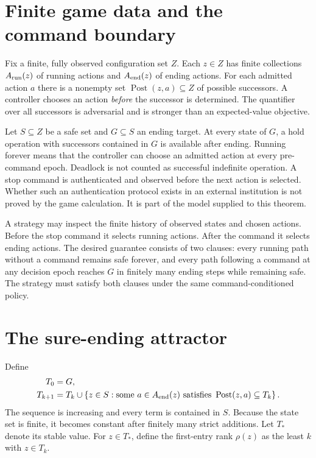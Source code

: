 \section{Finite game data and the command boundary}
Fix a finite, fully observed configuration set $Z$. Each $z\in Z$ has finite collections $A_{\rm run}(z)$ of running actions and $A_{\rm end}(z)$ of ending actions. For each admitted action $a$ there is a nonempty set $\operatorname{Post}(z,a)\subseteq Z$ of possible successors. A controller chooses an action \emph{before} the successor is determined. The quantifier over all successors is adversarial and is stronger than an expected-value objective.

Let $S\subseteq Z$ be a safe set and $G\subseteq S$ an ending target. At every state of $G$, a hold operation with successors contained in $G$ is available after ending. Running forever means that the controller can choose an admitted action at every pre-command epoch. Deadlock is not counted as successful indefinite operation. A stop command is authenticated and observed before the next action is selected. Whether such an authentication protocol exists in an external institution is not proved by the game calculation. It is part of the model supplied to this theorem.

A strategy may inspect the finite history of observed states and chosen actions. Before the stop command it selects running actions. After the command it selects ending actions. The desired guarantee consists of two clauses: every running path without a command remains safe forever, and every path following a command at any decision epoch reaches $G$ in finitely many ending steps while remaining safe. The strategy must satisfy both clauses under the same command-conditioned policy.

\section{The sure-ending attractor}
Define
\begin{align*}
T_0&=G,\\
T_{k+1}&=T_k\cup\left\{z\in S:\text{some }a\in A_{\rm end}(z)
\text{ satisfies }\operatorname{Post}(z,a)\subseteq T_k\right\}.
\end{align*}
The sequence is increasing and every term is contained in $S$. Because the state set is finite, it becomes constant after finitely many strict additions. Let $T_*$ denote its stable value. For $z\in T_*$, define the first-entry rank $\rho(z)$ as the least $k$ with $z\in T_k$.

